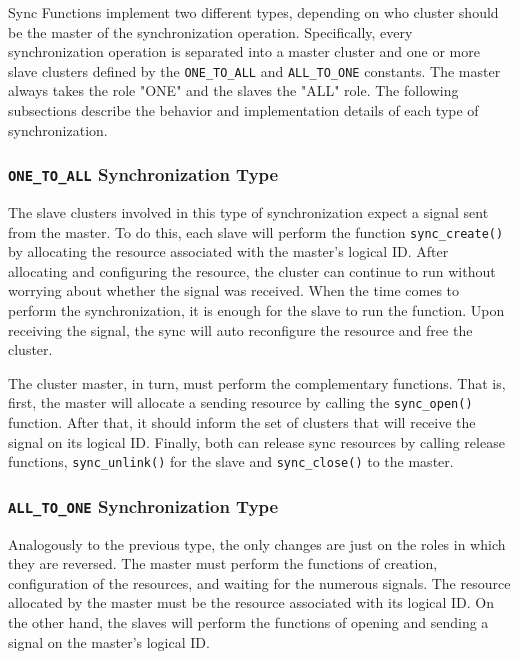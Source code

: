 		Sync Functions implement two different types, depending on who cluster
		should be the master of the synchronization operation.
		Specifically, every synchronization operation is separated into a
		master cluster and one or more slave clusters defined by the
		\texttt{ONE\_TO\_ALL} and \texttt{ALL\_TO\_ONE} constants.
		The master always takes the role "ONE" and the slaves the "ALL" role.
		The following subsections describe the behavior and implementation
		details of each type of synchronization.

			\subsubsection*{\texttt{ONE\_TO\_ALL} Synchronization Type}

				The slave clusters involved in this type of synchronization expect
				a signal sent from the master.
				To do this, each slave will perform the function \texttt{sync\_create()}
				by allocating the resource associated with the master's logical ID.
				After allocating and configuring the resource, the cluster can
				continue to run without worrying about whether the signal was received.
				When the time comes to perform the synchronization, it is enough for
				the slave to run the function.
				Upon receiving the signal, the sync will auto reconfigure the resource
				and free the cluster.

				The cluster master, in turn, must perform the complementary functions.
				That is, first, the master will allocate a sending resource by calling
				the \texttt{sync\_open()} function.
				After that, it should inform the set of clusters that will receive the
				signal on its logical ID.
				Finally, both can release sync resources by calling release functions,
				\texttt{sync\_unlink()} for the slave and \texttt{sync\_close()} to
				the master.

			\subsubsection*{\texttt{ALL\_TO\_ONE} Synchronization Type}

				Analogously to the previous type, the only changes are just on
				the roles in which they are reversed.
				The master must perform the functions of creation, configuration
				of the resources, and waiting for the numerous signals.
				The resource allocated by the master must be the resource
				associated with its logical ID.
				On the other hand, the slaves will perform the functions of
				opening and sending a signal on the master's logical ID.

